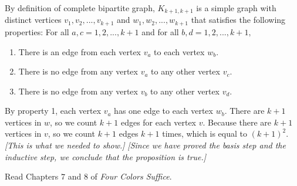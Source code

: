 \documentclass{article}
\begin{document}
By definition of complete bipartite graph, $K_{k+1,k+1}$ is a simple graph with distinct vertices $v_1, v_2,...,v_{k+1}$ and $w_1, w_2,...,w_{k+1}$ that satisfies the following properties: For all $a,c = 1,2,...,k+1$ and for all $b,d = 1,2,...,k+1,$
\begin{enumerate}
    \item There is an edge from each vertex $v_a$ to each vertex $w_b$.
    \item There is no edge from any vertex $v_a$ to any other vertex $v_c$.
    \item There is no edge from any vertex $v_b$ to any other vertex $v_d$.
\end{enumerate}
By property 1, each vertex $v_a$ has one edge to each vertex $w_b$. There are $k+1$ vertices in $w$, so we count $k+1$ edges for each vertex $v$. Because there are $k+1$ vertices in $v$, so we count $k+1$ edges $k+1$ times, which is equal to $(k+1)^2$.\newline
\emph{[This is what we needed to show.]}\newline
\emph{[Since we have proved the basis step and the inductive step, we conclude that the proposition is true.]}





\collab{} 

Read Chapters $7$ and $8$ of \emph{Four Colors Suffice}.
\end{document}
